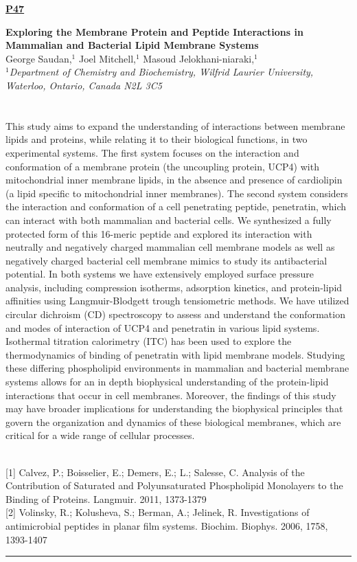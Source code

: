 \documentclass[titlepage,oneside,openany,10pt]{book}
\newenvironment{posterabswref}[5] %
        {
        \newcommand{\posterref}{#5}
	\begin{flushright}
                \underline{\textbf{#4}}
        \end{flushright}
        \textbf{#1}\\%
        #2\\%
        \textit{#3}\\\\%
        }
        {
        \vspace{0.5cm}
        \\\noindent \posterref \\ \noindent\rule{15cm}{0.5pt}%
        }
\begin{document}
\begin{posterabswref}
    {Exploring the Membrane Protein and Peptide Interactions in Mammalian and Bacterial Lipid Membrane Systems}
    {George Saudan,$^{1}$ Joel Mitchell,$^{1}$ Masoud Jelokhani-niaraki,$^{1}$}
    {
    $^1$Department of Chemistry and Biochemistry, Wilfrid Laurier University, Waterloo, Ontario, Canada N2L 3C5\\
    }
    {P47}
    {
    {[1]} Calvez, P.; Boisselier, E.; Demers, E.; L.; Salesse, C. Analysis of the Contribution of Saturated and Polyunsaturated Phospholipid Monolayers to the Binding of Proteins. Langmuir. 2011, 1373-1379\\
    {[2]} Volinsky, R.; Kolusheva, S.; Berman, A.; Jelinek, R. Investigations of antimicrobial peptides in planar film systems. Biochim. Biophys. 2006, 1758, 1393-1407
    }
    This study aims to expand the understanding of interactions between membrane lipids and proteins, while relating it to their biological functions, in two experimental systems. The first system focuses on the interaction and conformation of a membrane protein (the uncoupling protein, UCP4) with mitochondrial inner membrane lipids, in the absence and presence of cardiolipin (a lipid specific to mitochondrial inner membranes). The second system considers the interaction and conformation of a cell penetrating peptide, penetratin, which can interact with both mammalian and bacterial cells. We synthesized a fully protected form of this 16-meric peptide and explored its interaction with neutrally and negatively charged mammalian cell membrane models as well as negatively charged bacterial cell membrane mimics to study its antibacterial potential. In both systems we have extensively employed surface pressure analysis, including compression isotherms, adsorption kinetics, and protein-lipid affinities using Langmuir-Blodgett trough tensiometric methods. We have utilized circular dichroism (CD) spectroscopy to assess and understand the conformation and modes of interaction of UCP4 and penetratin in various lipid systems. Isothermal titration calorimetry (ITC) has been used to explore the thermodynamics of binding of penetratin with lipid membrane models. Studying these differing phospholipid environments in mammalian and bacterial membrane systems allows for an in depth biophysical understanding of the protein-lipid interactions that occur in cell membranes. Moreover, the findings of this study may have broader implications for understanding the biophysical principles that govern the organization and dynamics of these biological membranes, which are critical for a wide range of cellular processes.
    \label{SaudanG}
\end{posterabswref}
\end{document}
